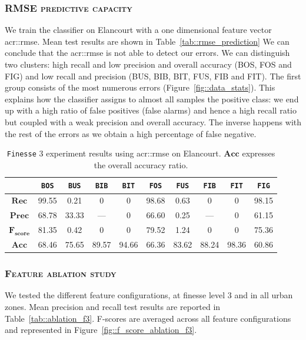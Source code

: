         \subsubsection{\textsc{RMSE predictive capacity}}
            We train the classifier on Elancourt with a one dimensional feature vector \gls{acr::rmse}. Mean test results are shown in Table~\ref{tab::rmse_prediction} We can conclude that the \gls{acr::rmse} is not able to detect our  errors.  We can distinguish two clusters: high recall and low precision and overall accuracy (BOS, FOS and FIG) and low recall and precision (BUS, BIB, BIT, FUS, FIB and FIT). The first group consists of the most numerous errors (Figure~\ref{fig::data_stats}). This explains how the classifier assigns to almost all samples the positive class: we end up with a high ratio of false positives (false alarms) and hence a high recall ratio but coupled with a weak precision and overall accuracy. The inverse happens with the rest of the errors as we obtain a high percentage of false negative.
            \begin{table}[h]
                \begin{tabular}{c c c c c c c c c c}
                    \toprule
                    & \texttt{BOS} & \texttt{BUS} & \texttt{BIB} & \texttt{BIT} & \texttt{FOS} & \texttt{FUS} & \texttt{FIB} & \texttt{FIT} & \texttt{FIG} \\
                    \midrule
                    $\bm{Rec}$ & 99.55 & 0.21 & 0 & 0 & 98.68 & 0.63 & 0 & 0 & 98.15 \\
                    \midrule
                    $\bm{Prec}$ & 68.78 & 33.33 & --- & 0 & 66.60 & 0.25 & --- & 0 & 61.15 \\
                    \midrule
                    $\bm{F_{score}}$ & 81.35 & 0.42 & 0 & 0 & 79.52 & 1.24 & 0 & 0 & 75.36 \\
                    \midrule
                    $\bm{Acc}$ & 68.46 & 75.65 & 89.57 & 94.66 & 66.36 & 83.62 & 88.24 & 98.36 & 60.86 \\
                    \bottomrule
                \end{tabular}
                \caption{
                    \label{tab::rmse} \texttt{Finesse} 3 experiment results using \gls{acr::rmse} on Elancourt.
                    $\bm{Acc}$ expresses the overall accuracy ratio.
                }
            \end{table}
        \subsubsection{\textsc{Feature ablation study}}
            \label{subsubsec:ablation}
            We tested the different feature configurations, at finesse level 3 and in all urban zones.
            Mean precision and recall test results are reported in Table~\ref{tab::ablation_f3}.
            F-scores are averaged across all feature configurations and represented in Figure~\ref{fig::f_score_ablation_f3}.
            
